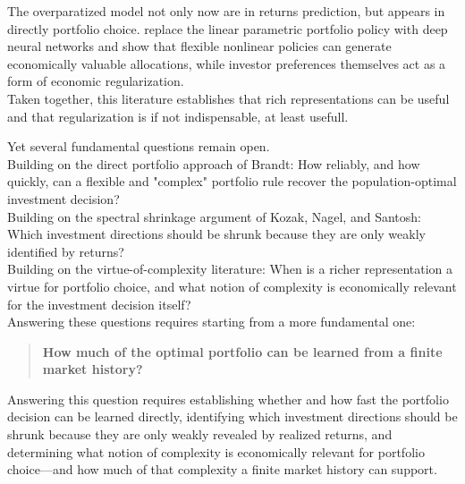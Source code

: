 The overparatized model not only now are in returns prediction, but appears
in directly portfolio choice.
\citet{simon2026} replace the linear parametric portfolio policy with deep neural
networks and show that flexible nonlinear policies can generate economically
valuable allocations, while investor preferences themselves act as a form of
economic regularization.\\


Taken together, this literature establishes that rich
representations can be useful and that regularization is if not indispensable, at least usefull.

Yet several fundamental questions remain open. \\


Building on the direct portfolio approach of Brandt: 
How reliably, and how quickly, can a flexible and "complex" portfolio rule recover the population-optimal investment decision?\\
Building on the spectral shrinkage argument of Kozak, Nagel, and Santosh: Which investment directions should be shrunk because they are only weakly identified by returns?\\
Building on the virtue-of-complexity literature: When is a richer representation a virtue for portfolio choice, and what notion of complexity is economically relevant for the investment decision itself?\\


Answering these questions requires starting from a more fundamental one:

\begin{quote}
\centering
\textbf{How much of the optimal portfolio can be learned from a finite market
history?}
\end{quote}

Answering this question requires establishing whether and how fast the portfolio decision can be learned directly, identifying which investment directions should be shrunk because they are only weakly revealed by realized returns, and determining what notion of complexity is economically relevant for portfolio choice—and how much of that complexity a finite market history can support.



